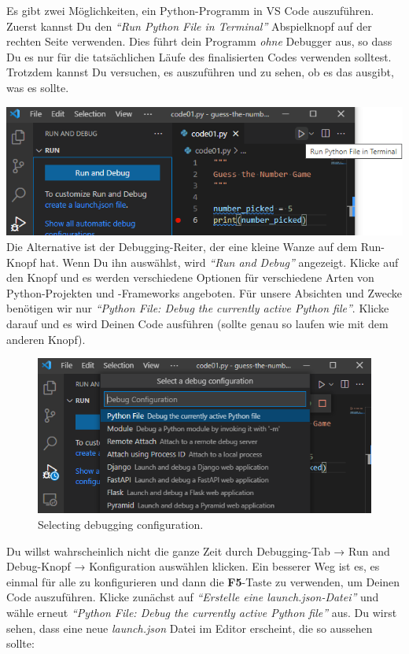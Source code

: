 \documentclass[
]{book}
\begin{document}
Es gibt zwei Möglichkeiten, ein Python-Programm in VS Code auszuführen. Zuerst kannst Du den \emph{``Run Python File in Terminal''} Abspielknopf auf der rechten Seite verwenden. Dies führt dein Programm \emph{ohne} Debugger aus, so dass Du es nur für die tatsächlichen Läufe des finalisierten Codes verwenden solltest. Trotzdem kannst Du versuchen, es auszuführen und zu sehen, ob es das ausgibt, was es sollte.

\includegraphics{images/debug-vs-run.png}
Die Alternative ist der Debugging-Reiter, der eine kleine Wanze auf dem Run-Knopf hat. Wenn Du ihn auswählst, wird \emph{``Run and Debug''} angezeigt. Klicke auf den Knopf und es werden verschiedene Optionen für verschiedene Arten von Python-Projekten und -Frameworks angeboten. Für unsere Absichten und Zwecke benötigen wir nur \emph{``Python File: Debug the currently active Python file''}. Klicke darauf und es wird Deinen Code ausführen (sollte genau so laufen wie mit dem anderen Knopf).

\begin{figure}
\centering
\includegraphics{images/debug-select-debug-configuration.png}
\caption{Selecting debugging configuration.}
\end{figure}

Du willst wahrscheinlich nicht die ganze Zeit durch Debugging-Tab → Run and Debug-Knopf → Konfiguration auswählen klicken. Ein besserer Weg ist es, es einmal für alle zu konfigurieren und dann die \textbf{F5}-Taste zu verwenden, um Deinen Code auszuführen. Klicke zunächst auf \emph{``Erstelle eine launch.json-Datei''} und wähle erneut \emph{``Python File: Debug the currently active Python file''} aus. Du wirst sehen, dass eine neue \emph{launch.json} Datei im Editor erscheint, die so aussehen sollte:
\end{document}
